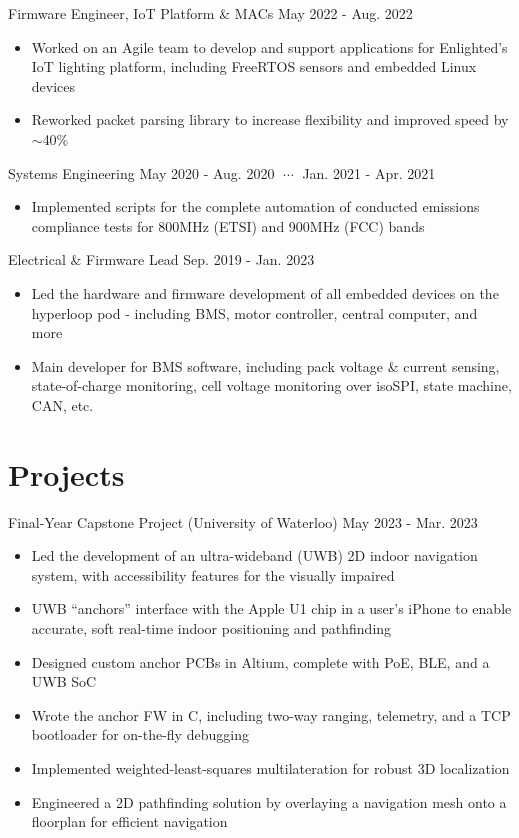 \documentclass[lighthipster]{styles}
\begin{document}
\begin{paracol}{2}
{Firmware Engineer, IoT Platform \& MACs}
{May 2022 - Aug. 2022}
\begin{itemize}
    \item Worked on an Agile team to develop and support applications for Enlighted's
          IoT lighting platform, including FreeRTOS sensors and embedded Linux devices
    \item Reworked packet parsing library to increase flexibility and improved speed by $\sim$40\%
\end{itemize}

{Systems Engineering}
{May 2020 - Aug. 2020 $\;\cdots\;$ Jan. 2021 - Apr. 2021}
\begin{itemize}
    \item Implemented scripts for the complete automation of conducted emissions
          compliance tests for 800MHz (ETSI) and 900MHz (FCC) bands
\end{itemize}

{Electrical \& Firmware Lead}
{Sep. 2019 - Jan. 2023}
\begin{itemize}
    \item Led the hardware and firmware development of all embedded devices on the hyperloop
          pod - including BMS, motor controller, central computer, and more
    \item Main developer for BMS software, including pack voltage \& current sensing,
          state-of-charge monitoring, cell voltage monitoring over isoSPI, state machine, CAN, etc.
\end{itemize}

\section*{Projects}

{Final-Year Capstone Project (University of Waterloo)}
{May 2023 - Mar. 2023}
\begin{itemize}
    \item Led the development of an ultra-wideband (UWB) 2D indoor navigation system,
          with accessibility features for the visually impaired
    \item UWB “anchors” interface with the Apple U1 chip in a user's iPhone to enable
          accurate, soft real-time indoor positioning and pathfinding
    \item Designed custom anchor PCBs in Altium, complete with PoE, BLE, and a UWB SoC
    \item Wrote the anchor FW in C, including two-way ranging, telemetry, and a TCP
          bootloader for on-the-fly debugging
    \item Implemented weighted-least-squares multilateration for robust 3D localization 
    \item Engineered a 2D pathfinding solution by overlaying a navigation mesh onto a
          floorplan for efficient navigation
\end{itemize}



\end{paracol}
\end{document}
